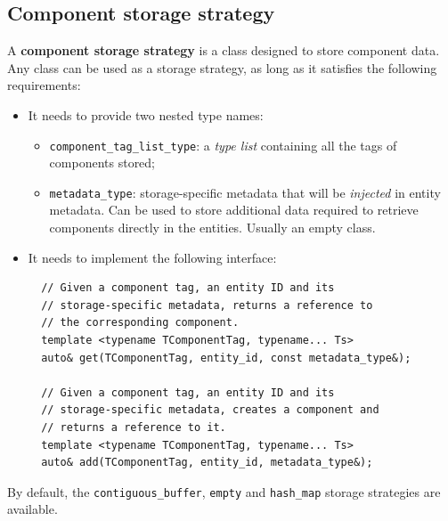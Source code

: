 \documentclass[oneside, 12pt, a4paper, openany]{book}
\begin{document}
\hypertarget{storage_comp_strategy}{\subsection{Component storage
strategy}\label{storage_comp_strategy}}

A \textbf{component storage strategy} is a class designed to store
component data. Any class can be used as a storage strategy, as long as
it satisfies the following requirements:

\begin{itemize}
\item
  It needs to provide two nested type names:

  \begin{itemize}
  \item
    \texttt{component_tag_list_type}:
    a \emph{type list} containing all the tags of components stored;
  \item
    \texttt{metadata_type}:
    storage-specific metadata that will be \emph{injected} in entity
    metadata. Can be used to store additional data required to retrieve
    components directly in the entities. Usually an empty class.
  \end{itemize}
\item
  It needs to implement the following interface:

  \begin{verbatim}
  // Given a component tag, an entity ID and its
  // storage-specific metadata, returns a reference to
  // the corresponding component.
  template <typename TComponentTag, typename... Ts>
  auto& get(TComponentTag, entity_id, const metadata_type&);

  // Given a component tag, an entity ID and its
  // storage-specific metadata, creates a component and
  // returns a reference to it.
  template <typename TComponentTag, typename... Ts>
  auto& add(TComponentTag, entity_id, metadata_type&);
  \end{verbatim}
\end{itemize}

By default, the
\texttt{contiguous_buffer},
\texttt{empty}
and
\texttt{hash_map}
storage strategies are available.
\end{document}

